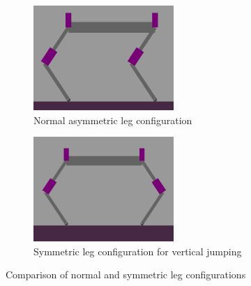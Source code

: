 \begin{figure}[h]
    \centering
    \begin{subfigure}[b]{0.48\textwidth}
        \centering
        \includegraphics[width=\textwidth]{Images/link_length_optimization/asymmetric_legs.png}
        \caption{Normal asymmetric leg configuration}
    \end{subfigure}
    \hfill
    \begin{subfigure}[b]{0.48\textwidth}
        \centering
        \includegraphics[width=\textwidth]{Images/link_length_optimization/symmetric_legs.png}
        \caption{Symmetric leg configuration for vertical jumping}
    \end{subfigure}
    \caption{Comparison of normal and symmetric leg configurations}
    \label{fig:link_length_optimization:flipped_legs}
\end{figure}


